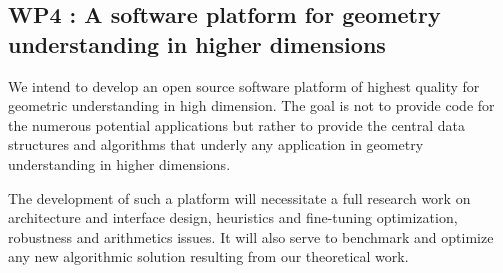 
\subsection*{WP4 : A software platform for geometry understanding in higher
  dimensions}

We intend to develop an open source software platform of highest
quality %
for geometric understanding in high dimension.  The goal
is not to provide code for the numerous potential applications but
rather to provide the central data structures and algorithms that
underly any application in geometry understanding in higher
dimensions.

The development of such a
platform will necessitate a full research work on architecture and
interface design, heuristics and fine-tuning optimization, robustness
and arithmetics issues. It will also serve to benchmark and optimize any
new algorithmic solution resulting from our theoretical work. 
%
%
%
